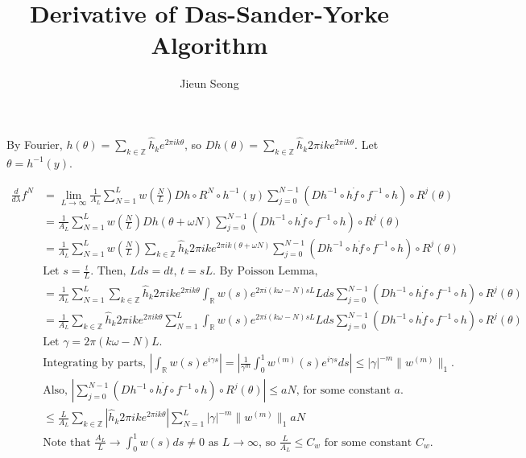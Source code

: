 \documentclass[12pt]{article}
\title{Derivative of Das-Sander-Yorke Algorithm}
\author{Jieun Seong}
\date{}
\newcommand{\Z}{\mathbb{Z}}
\newcommand{\R}{\mathbb{R}}
\newcommand{\hk}{\widehat{h}_k}
\begin{document}

By Fourier, $h(\theta)=\sum_{k\in\Z}\hk e^{2\pi i k \theta}$, so $Dh(\theta)=\sum_{k\in\Z} \hk 2\pi i k e^{2\pi i k \theta}$. Let $\theta = h^{-1}(y)$. 

\begin{equation*}\begin{split}
     \frac{d}{d\lambda} f^N
     &= \lim_{L\rightarrow\infty} \frac{1}{A_L} \sum_{N=1}^L w\left(\frac{N}{L}\right) Dh \circ R^N \circ h^{-1}(y) \sum_{j=0}^{N-1} (Dh^{-1} \circ h \Dot{f} \circ f^{-1} \circ h) \circ R^j (\theta)\\
     &= \frac{1}{A_L}\sum_{N=1}^L w\left(\frac{N}{L}\right) Dh(\theta+\omega N) \sum_{j=0}^{N-1} (Dh^{-1} \circ h \Dot{f} \circ f^{-1} \circ h) \circ R^j (\theta)\\
     &= \frac{1}{A_L}\sum_{N=1}^L w\left(\frac{N}{L}\right) \sum_{k\in\Z}\hk 2 \pi i k e^{2\pi i k (\theta+\omega N)} \sum_{j=0}^{N-1} (Dh^{-1} \circ h \Dot{f} \circ f^{-1} \circ h) \circ R^j (\theta)\\
     &\text{Let $s=\frac{t}{L}$. Then, $Lds=dt$, $t=sL$. By Poisson Lemma,}\\
     &= \frac{1}{A_L}\sum_{N=1}^L \sum_{k\in\Z}\hk 2 \pi i k e^{2\pi i k \theta} \int_\R w(s)e^{2 \pi i (k\omega - N) sL}Lds \sum_{j=0}^{N-1} (Dh^{-1} \circ h \Dot{f} \circ f^{-1} \circ h) \circ R^j (\theta)\\
     &=\frac{1}{A_L} \sum_{k\in\Z}\hk 2 \pi i k e^{2\pi i k \theta} \sum_{N=1}^L \int_\R w(s)e^{2 \pi i (k\omega - N) sL}Lds \sum_{j=0}^{N-1} (Dh^{-1} \circ h \Dot{f} \circ f^{-1} \circ h) \circ R^j (\theta)\\
     &\text{Let $\gamma = 2\pi(k\omega-N)L$.} \\
     &\text{Integrating by parts, $\left| \int_\R w(s)e^{i\gamma s} \right| = \left| \frac{1}{\gamma^m} \int_0^1 w^{(m)}(s)e^{i\gamma s}ds\right| \leq |\gamma|^{-m}\|w^{(m)}\|_1. $}\\
     &\text{Also, $\left|\sum_{j=0}^{N-1} (Dh^{-1} \circ h \Dot{f} \circ f^{-1} \circ h) \circ R^j (\theta)\right|\leq aN$, for some constant $a$.}\\
     &\leq \frac{L}{A_L} \sum_{k\in\Z} \left| \hk 2\pi i k e^{2\pi i k \theta} \right| \sum_{N=1}^L|\gamma|^{-m}\|w^{(m)}\|_1 aN\\
     &\text{Note that $\frac{A_L}{L} \rightarrow \int_0^1 w(s)ds \neq 0$ as $L\rightarrow\infty$, so $\frac{L}{A_L} \leq C_w$ for some constant $C_w$. }\\

\end{split}
\end{equation*}
\end{document}
